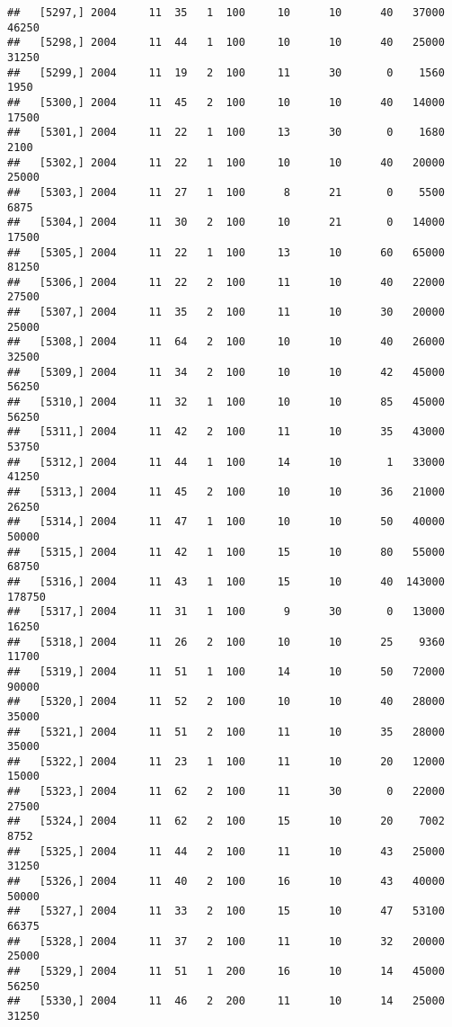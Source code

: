 \documentclass{article}\usepackage[]{graphicx}\usepackage[]{color}
\makeatletter
\newenvironment{kframe}{%
 \def\at@end@of@kframe{}%
 \ifinner\ifhmode%
  \def\at@end@of@kframe{\end{minipage}}%
  \begin{minipage}{\columnwidth}%
 \fi\fi%
 \def\FrameCommand##1{\hskip\@totalleftmargin \hskip-\fboxsep
 \colorbox{shadecolor}{##1}\hskip-\fboxsep
     \hskip-\linewidth \hskip-\@totalleftmargin \hskip\columnwidth}%
 \MakeFramed {\advance\hsize-\width
   \@totalleftmargin\z@ \linewidth\hsize
   \@setminipage}}%
 {\par\unskip\endMakeFramed%
 \at@end@of@kframe}
\newenvironment{knitrout}{}{} %
\makeatother
\begin{document}
\begin{knitrout}
\begin{kframe}
\begin{verbatim}
##   [5297,] 2004     11  35   1  100     10      10      40   37000   46250
##   [5298,] 2004     11  44   1  100     10      10      40   25000   31250
##   [5299,] 2004     11  19   2  100     11      30       0    1560    1950
##   [5300,] 2004     11  45   2  100     10      10      40   14000   17500
##   [5301,] 2004     11  22   1  100     13      30       0    1680    2100
##   [5302,] 2004     11  22   1  100     10      10      40   20000   25000
##   [5303,] 2004     11  27   1  100      8      21       0    5500    6875
##   [5304,] 2004     11  30   2  100     10      21       0   14000   17500
##   [5305,] 2004     11  22   1  100     13      10      60   65000   81250
##   [5306,] 2004     11  22   2  100     11      10      40   22000   27500
##   [5307,] 2004     11  35   2  100     11      10      30   20000   25000
##   [5308,] 2004     11  64   2  100     10      10      40   26000   32500
##   [5309,] 2004     11  34   2  100     10      10      42   45000   56250
##   [5310,] 2004     11  32   1  100     10      10      85   45000   56250
##   [5311,] 2004     11  42   2  100     11      10      35   43000   53750
##   [5312,] 2004     11  44   1  100     14      10       1   33000   41250
##   [5313,] 2004     11  45   2  100     10      10      36   21000   26250
##   [5314,] 2004     11  47   1  100     10      10      50   40000   50000
##   [5315,] 2004     11  42   1  100     15      10      80   55000   68750
##   [5316,] 2004     11  43   1  100     15      10      40  143000  178750
##   [5317,] 2004     11  31   1  100      9      30       0   13000   16250
##   [5318,] 2004     11  26   2  100     10      10      25    9360   11700
##   [5319,] 2004     11  51   1  100     14      10      50   72000   90000
##   [5320,] 2004     11  52   2  100     10      10      40   28000   35000
##   [5321,] 2004     11  51   2  100     11      10      35   28000   35000
##   [5322,] 2004     11  23   1  100     11      10      20   12000   15000
##   [5323,] 2004     11  62   2  100     11      30       0   22000   27500
##   [5324,] 2004     11  62   2  100     15      10      20    7002    8752
##   [5325,] 2004     11  44   2  100     11      10      43   25000   31250
##   [5326,] 2004     11  40   2  100     16      10      43   40000   50000
##   [5327,] 2004     11  33   2  100     15      10      47   53100   66375
##   [5328,] 2004     11  37   2  100     11      10      32   20000   25000
##   [5329,] 2004     11  51   1  200     16      10      14   45000   56250
##   [5330,] 2004     11  46   2  200     11      10      14   25000   31250

\end{verbatim}
\end{kframe}
\end{knitrout}
\end{document}
